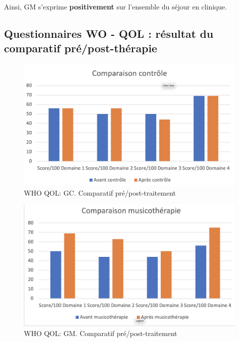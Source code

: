                 Ainsi,  GM s'exprime
                 \textbf{positivement}
                 sur l'ensemble du séjour en clinique.

                 \subsection{Questionnaires WO - QOL : résultat du comparatif pré/post-thérapie}



\begin{figure}
\centering
\includegraphics[width=1.0\linewidth]{images/Compcontrole.png}
\caption[Schéma du déroulement]{WHO QOL:  GC. Comparatif pré/post-traitement}

\end{figure}

\begin{figure}
\centering
\includegraphics[width=1.0\linewidth]{images/Compmusico.png}
\caption[Schéma du déroulement]{ WHO QOL: GM. Comparatif pré/post-traitement }

\end{figure}


